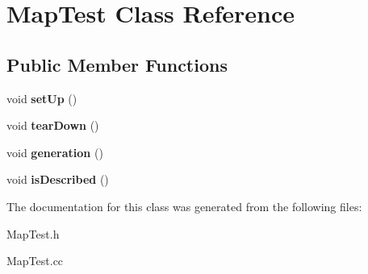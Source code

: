 \hypertarget{classMapTest}{
\section{MapTest Class Reference}
\label{classMapTest}
}
\subsection*{Public Member Functions}
\begin{DoxyCompactItemize}
\item 
\hypertarget{classMapTest_a548501698e49e4de388482c502962cfd}{
void {\bfseries setUp} ()}
\label{classMapTest_a548501698e49e4de388482c502962cfd}

\item 
\hypertarget{classMapTest_a1a75bd7462d39afc6f5039fa36252cca}{
void {\bfseries tearDown} ()}
\label{classMapTest_a1a75bd7462d39afc6f5039fa36252cca}

\item 
\hypertarget{classMapTest_aa14af1f94d8580fe7be947494cad5b95}{
void {\bfseries generation} ()}
\label{classMapTest_aa14af1f94d8580fe7be947494cad5b95}

\item 
\hypertarget{classMapTest_a2392fc57aa7e33998beee50ca0e80df3}{
void {\bfseries isDescribed} ()}
\label{classMapTest_a2392fc57aa7e33998beee50ca0e80df3}

\end{DoxyCompactItemize}


The documentation for this class was generated from the following files:\begin{DoxyCompactItemize}
\item 
MapTest.h\item 
MapTest.cc\end{DoxyCompactItemize}
